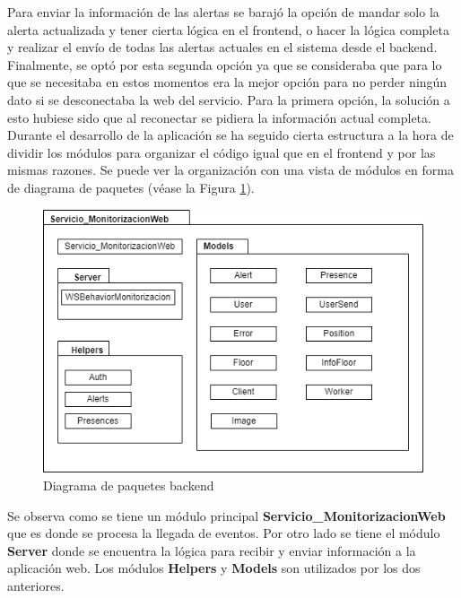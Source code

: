 Para enviar la información de las alertas se barajó la opción de mandar solo la alerta actualizada y tener cierta lógica en el frontend, o hacer la lógica completa y realizar el envío de todas las alertas actuales en el sistema desde el backend. Finalmente, se optó por esta segunda opción ya que se consideraba que para lo que se necesitaba en estos momentos era la mejor opción para no perder ningún dato si se desconectaba la web del servicio. Para la primera opción, la solución a esto hubiese sido que al reconectar se pidiera la información actual completa.\\

Durante el desarrollo de la aplicación se ha seguido cierta estructura a la hora de dividir los módulos para organizar el código igual que en el frontend y por las mismas razones. Se puede ver la organización con una vista de módulos en forma de diagrama de paquetes (véase la Figura \ref{fig:paquetes-backend}).\\

\begin{figure}[H]
    \centering
    \includegraphics[width=12cm]{Imagenes/Diagrama-paquetes-backend}
    \caption{Diagrama de paquetes backend}
    \label{fig:paquetes-backend}
\end{figure}

Se observa como se tiene un módulo principal \textbf{Servicio\_MonitorizacionWeb} que es donde se procesa la llegada de eventos. Por otro lado se tiene el módulo \textbf{Server} donde se encuentra la lógica para recibir y enviar información a la aplicación web. Los módulos \textbf{Helpers} y \textbf{Models} son utilizados por los dos anteriores.\\




